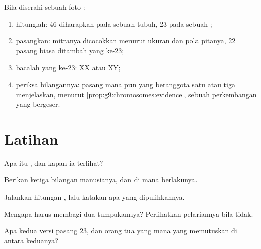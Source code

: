 \begin{method}\label{met:g9:chromosomes:read}
Bila diserahi sebuah foto :
\begin{enumerate}
  \item hitunglah: 46 diharapkan pada sebuah  tubuh, 23
        pada sebuah ;
  \item pasangkan: mitranya dicocokkan menurut ukuran dan
        pola pitanya, 22 pasang biasa ditambah yang ke-23;
  \item bacalah yang ke-23: XX atau XY;
  \item periksa bilangannya: pasang mana pun yang beranggota
        satu atau tiga menjelaskan, menurut
        \cref{prop:g9:chromosomes:evidence}, sebuah
        perkembangan yang bergeser.
\end{enumerate}
\end{method}

\section{Latihan}

\begin{exercise}[$\star$]\label{exo:g9:chromosomes:1}
Apa itu , dan kapan ia terlihat?
\end{exercise}

\begin{exercise}[$\star$]\label{exo:g9:chromosomes:2}
Berikan ketiga bilangan manusianya, dan di mana berlakunya.
\end{exercise}

\begin{exercise}[$\star$]\label{exo:g9:chromosomes:3}
Jalankan hitungan , lalu katakan apa yang
dipulihkannya.
\end{exercise}

\begin{exercise}[$\star$]\label{exo:g9:chromosomes:4}
Mengapa  harus membagi dua tumpukannya? Perlihatkan
pelariannya bila tidak.
\end{exercise}

\begin{exercise}[$\star$]\label{exo:g9:chromosomes:5}
Apa kedua versi pasang 23, dan  orang tua yang mana
yang memutuskan di antara keduanya?
\end{exercise}

